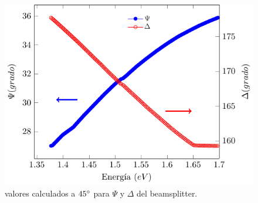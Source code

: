 \begin{figure}[!hbt]
	\centering
	\includegraphics[scale=1.3]{figMet/figElips/grafPsidelta45.pdf}
	\caption[Gr\'aficas de $\Psi$ y $\Delta$ del beamspliter a $70 \degree$.]{valores calculados a $45\degree$  para $\Psi$ y $\Delta$ del beamsplitter.}
	\label{Met:fig:ElipBS45}
\end{figure}
\newline
